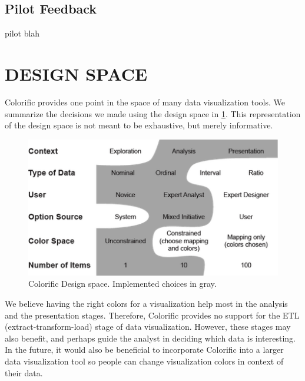 \documentclass{article}
\newcommand{\system}{Colorific\xspace}
\begin{document}
\begin{center}
\end{center}

\subsection{Pilot Feedback}
pilot blah

\section{DESIGN SPACE}
\system provides one point in the space of many data visualization tools. We summarize the decisions we made using the design space in \ref{design-space}. This representation of the design space is not meant to be exhaustive, but merely informative. 

\begin{figure}
\label{design-space}
\includegraphics{design_space.png}
\caption{\system Design space. Implemented choices in gray.}
\end{figure}
 We believe having the right colors for a visualization help most in the analysis and the presentation stages. Therefore, \system provides no support for the ETL (extract-transform-load) stage of data visualization. However, these stages may also benefit, and perhaps guide the analyst in deciding which data is interesting. In the future, it would also be beneficial to incorporate \system into a larger data visualization tool so people can change visualization colors in context of their data.
\end{document}
